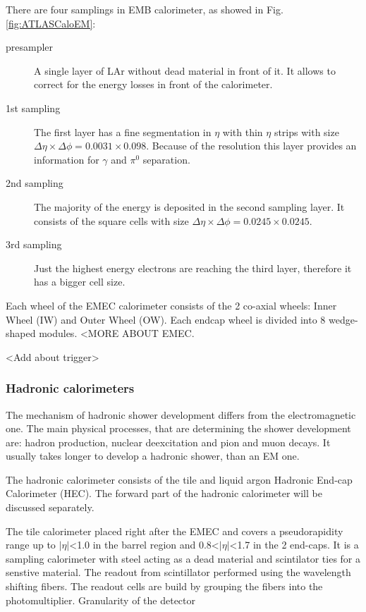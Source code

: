 There are four samplings in EMB calorimeter, as showed in Fig. \ref{fig:ATLASCaloEM}:
\begin{description}
\item [presampler] A single layer of LAr without dead material in front of it. It allows to correct for the energy losses in front of the calorimeter. 
\item [1st sampling] The first layer has a fine segmentation in $\eta$ with thin $\eta$ strips with size $\Delta \eta \times \Delta \phi = 0.0031 \times 0.098$. Because of the resolution this layer provides an information for $\gamma$ and $\pi^0$ separation.
\item [2nd sampling] The majority of the energy is deposited in the second sampling layer. It consists of the square cells with size $\Delta \eta \times \Delta \phi = 0.0245 \times 0.0245$.
\item [3rd sampling] Just the highest energy electrons are reaching the third layer, therefore it has a bigger cell size.
\end{description} 

Each wheel of the EMEC calorimeter consists of the 2 co-axial wheels: Inner Wheel (IW) and Outer Wheel (OW). Each endcap wheel is divided into 8 wedge-shaped modules.  <MORE ABOUT EMEC.

<Add about trigger>

\subsubsection{Hadronic calorimeters}

The mechanism of hadronic shower development differs from the electromagnetic one. The main physical processes, that are determining the shower development are: hadron production, nuclear deexcitation and pion and muon decays. It usually takes longer to develop a hadronic shower, than an EM one.

The \atlas hadronic calorimeter consists of the tile and liquid argon Hadronic End-cap Calorimeter (HEC). The forward part of the hadronic calorimeter will be discussed separately.

The tile calorimeter placed right after the EMEC and covers a pseudorapidity range up to $|\eta|$<1.0 in the barrel region and 0.8<$|\eta|$<1.7 in the 2 end-caps. It is a sampling calorimeter with steel acting as a dead material and scintilator ties for a senstive material. The readout from scintillator performed using the wavelength shifting fibers.  The readout cells are build by grouping the fibers into the photomultiplier. Granularity of the detector

